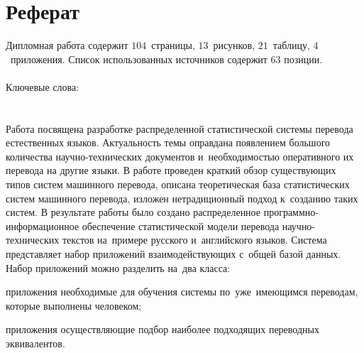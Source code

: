 
\section*{Реферат}

	Дипломная работа содержит 
		$104$~страницы, 
		$13$~рисунков, 
		$21$~таблицу,
		$4$~приложения.
	Список использованных источников содержит 
		$63$ позиции.\\ \\
	Ключевые слова: \\ 
	\uppercase{
		\worktextkeywords
	}\\ \\
	Работа посвящена разработке распределенной статистической системы 
	перевода естественных языков.
	Актуальность темы оправдана появлением большого количества научно-технических 
	документов и~необходимостью оперативного их перевода на другие языки. 
	В работе проведен краткий обзор существующих типов систем машинного перевода,
	описана теоретическая база статистических систем машинного перевода, 
	изложен нетрадиционный подход к~созданию таких систем. 
	В результате работы было создано распределенное 
	программно-информационное обеспечение
	статистической модели перевода научно-технических текстов 
	на~примере русского и~английского языков.
	Система представляет набор приложений 
	взаимодействующих с~общей базой данных.
	Набор приложений можно разделить на~два класса:
	\begin{ditemize}
		\item приложения необходимые для обучения системы по~уже~имеющимся
		переводам, которые выполнены человеком;
		\item приложения осуществляющие подбор наиболее 
		подходящих переводных эквивалентов.
	\end{ditemize}
